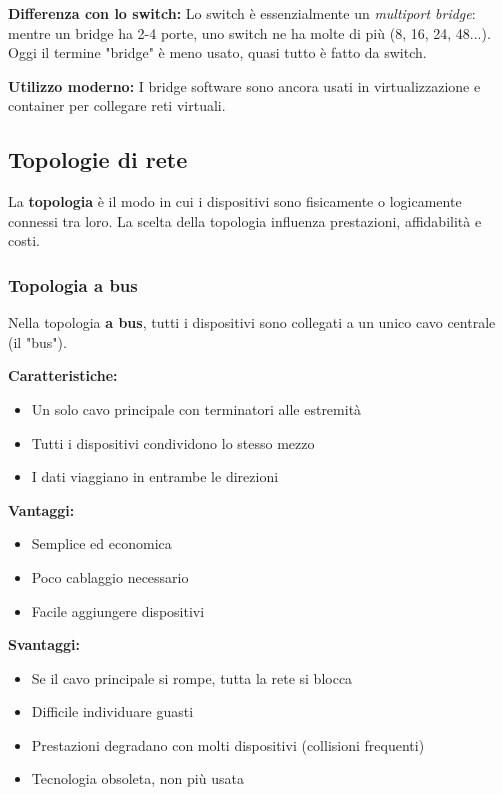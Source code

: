 \documentclass[12pt,a4paper]{article}
\begin{document}
\textbf{Differenza con lo switch:}
Lo switch è essenzialmente un \textit{multiport bridge}: mentre un bridge ha 2-4 porte, uno switch ne ha molte di più (8, 16, 24, 48...). Oggi il termine "bridge" è meno usato, quasi tutto è fatto da switch.

\textbf{Utilizzo moderno:}
I bridge software sono ancora usati in virtualizzazione e container per collegare reti virtuali.

\subsection{Topologie di rete}

La \textbf{topologia} è il modo in cui i dispositivi sono fisicamente o logicamente connessi tra loro. La scelta della topologia influenza prestazioni, affidabilità e costi.

\subsubsection{Topologia a bus}

Nella topologia \textbf{a bus}, tutti i dispositivi sono collegati a un unico cavo centrale (il "bus").

\textbf{Caratteristiche:}
\begin{itemize}
    \item Un solo cavo principale con terminatori alle estremità
    \item Tutti i dispositivi condividono lo stesso mezzo
    \item I dati viaggiano in entrambe le direzioni
\end{itemize}

\textbf{Vantaggi:}
\begin{itemize}
    \item Semplice ed economica
    \item Poco cablaggio necessario
    \item Facile aggiungere dispositivi
\end{itemize}

\textbf{Svantaggi:}
\begin{itemize}
    \item Se il cavo principale si rompe, tutta la rete si blocca
    \item Difficile individuare guasti
    \item Prestazioni degradano con molti dispositivi (collisioni frequenti)
    \item Tecnologia obsoleta, non più usata
\end{itemize}
\end{document}
